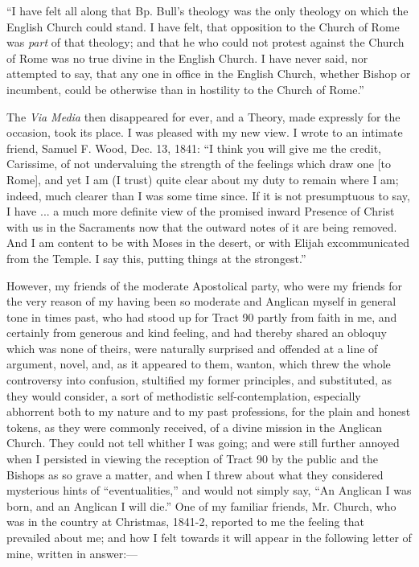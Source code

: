 ``I have felt all along that Bp. Bull's theology was the only
theology on which the English Church could stand. I have felt, that
opposition to the Church of Rome was \emph{part} of that theology; and
that he who could not protest against the Church of Rome was no true
divine in the English Church. I have never said, nor attempted to say,
that any one in office in the English Church, whether Bishop or
incumbent, could be otherwise than in hostility to the Church of
Rome.''

The \emph{Via Media} then disappeared for ever, and a Theory,
made expressly for the occasion, took its place. I was pleased with my
new view. I wrote to an intimate friend, Samuel F. Wood, Dec.
13, 1841: ``I think you will give me the credit, Carissime, of not
undervaluing the strength of the feelings which draw one [to Rome], and yet I am (I trust) quite clear about my duty to remain where I
am; indeed, much clearer than I was some time since. If it is not
presumptuous to say, I have ... a much more definite view of the
promised inward Presence of Christ with us in the Sacraments now that
the outward notes of it are being removed. And I am content to be with
Moses in the desert, or with Elijah excommunicated from the
Temple. I say this, putting things at the strongest.''

However, my friends of the moderate Apostolical party, who were my
friends for the very reason of my having been so moderate and Anglican
myself in general tone in times past, who had stood up for Tract 90
partly from faith in me, and certainly from generous and kind feeling,
and had thereby shared an obloquy which was none of theirs, were
naturally surprised and offended at a line of argument, novel, and, as
it appeared to them, wanton, which threw the whole controversy into
confusion, stultified my former principles, and substituted, as they
would consider, a sort of methodistic self-contemplation, especially
abhorrent both to my nature and to my past professions, for the plain
and honest tokens, as they were commonly received, of a divine mission
in the Anglican Church. They could not tell whither I was going; and
were still further annoyed when I persisted in viewing the reception of
Tract 90 by the public and the Bishops as so grave a matter, and when I threw about what they considered mysterious hints of
``eventualities,'' and would not simply say, ``An Anglican I
was born, and an Anglican I will die.'' One of my familiar friends, Mr. Church, who was in the country at Christmas, 1841-2,
reported to me the feeling that prevailed about me; and how I felt
towards it will appear in the following letter of mine, written in
answer:—

